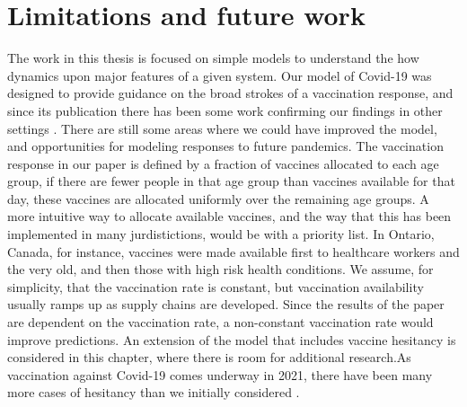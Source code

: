 \section{Limitations and future work}

The work in this thesis is focused on simple models to understand the how dynamics upon major features of a given system. Our model of Covid-19 was designed to provide guidance on the broad strokes of a vaccination response, and since its publication there has been some work confirming our findings in other settings \cite{chen2021age,hogan2021within}. There are still some areas where we could have improved the model, and opportunities for modeling responses to future pandemics. The vaccination response in our paper is defined by a fraction of vaccines allocated to each age group, if there are fewer people in that age group than vaccines available for that day, these vaccines are allocated uniformly over the remaining age groups. A more intuitive way to allocate available vaccines, and the way that this has been implemented in many jurdistictions, would be with a priority list. In Ontario, Canada, for instance, vaccines were made available first to healthcare workers and the very old, and then those with high risk health conditions.  We assume, for simplicity, that the vaccination rate is constant, but vaccination availability usually ramps up as supply chains are developed. Since the results of the paper are dependent on the vaccination rate, a non-constant vaccination rate would improve predictions. An extension of the model that includes vaccine hesitancy is considered in this chapter, where there is room for additional research.As vaccination against Covid-19 comes underway in 2021, there have been many more cases of hesitancy than we initially considered \cite{schwarzinger2021covid,soares2021factors,callaghan2020correlates}. 

